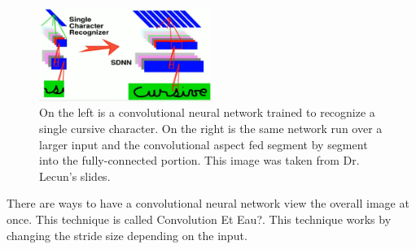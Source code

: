 \begin{figure}[ht]
  \centering
      \includegraphics[width=0.5\textwidth]{figs/SDNN.png}
          \caption{
            On the left is a convolutional neural network trained to recognize a single cursive character.
            On the right is the same network run over a larger input and the convolutional aspect fed segment by segment into the fully-connected portion.
            This image was taken from Dr. Lecun's slides.
          }
\end{figure}

There are ways to have a convolutional neural network view the overall image at once.
This technique is called 
Convolution Et Eau?.
This technique works by changing the stride size depending on the input.